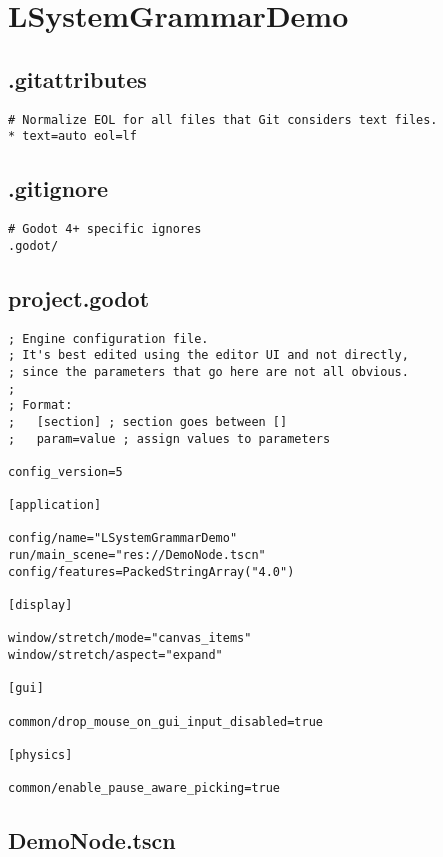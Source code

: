 \section{LSystemGrammarDemo}

\subsection{.gitattributes}

\begin{lstlisting}
# Normalize EOL for all files that Git considers text files.
* text=auto eol=lf
\end{lstlisting}

\subsection{.gitignore}

\begin{lstlisting}
# Godot 4+ specific ignores
.godot/
\end{lstlisting}

\subsection{project.godot}

\begin{lstlisting}
; Engine configuration file.
; It's best edited using the editor UI and not directly,
; since the parameters that go here are not all obvious.
;
; Format:
;   [section] ; section goes between []
;   param=value ; assign values to parameters

config_version=5

[application]

config/name="LSystemGrammarDemo"
run/main_scene="res://DemoNode.tscn"
config/features=PackedStringArray("4.0")

[display]

window/stretch/mode="canvas_items"
window/stretch/aspect="expand"

[gui]

common/drop_mouse_on_gui_input_disabled=true

[physics]

common/enable_pause_aware_picking=true
\end{lstlisting}

\subsection{DemoNode.tscn}

